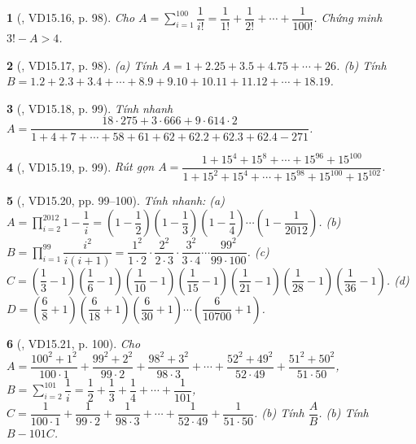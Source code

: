 \documentclass{article}
\newtheorem{baitoan}{}
\begin{document}
\begin{baitoan}[\cite{TLCT_THCS_Toan_6_so_hoc}, VD15.16, p. 98]
	Cho $A = \sum_{i=1}^{100} \dfrac{1}{i!} = \dfrac{1}{1!} + \dfrac{1}{2!} + \cdots + \dfrac{1}{100!}$. Chứng minh $3! - A > 4$.
\end{baitoan}

\begin{baitoan}[\cite{TLCT_THCS_Toan_6_so_hoc}, VD15.17, p. 98]
	(a) Tính $A = 1 + 2.25 + 3.5 + 4.75 + \cdots + 26$. (b) Tính $B = 1.2 + 2.3 + 3.4 + \cdots + 8.9 + 9.10 + 10.11 + 11.12 + \cdots + 18.19$.
\end{baitoan}

\begin{baitoan}[\cite{TLCT_THCS_Toan_6_so_hoc}, VD15.18, p. 99]
	Tính nhanh $A = \dfrac{18\cdot275 + 3\cdot666 + 9\cdot614\cdot2}{1 + 4 + 7 + \cdots + 58 + 61 + 62 + 62.2 + 62.3 + 62.4 - 271}$.
\end{baitoan}

\begin{baitoan}[\cite{TLCT_THCS_Toan_6_so_hoc}, VD15.19, p. 99]
	Rút gọn $A = \dfrac{1 + 15^4 + 15^8 + \cdots + 15^{96} + 15^{100}}{1 + 15^2 + 15^4 + \cdots + 15^{98} + 15^{100} + 15^{102}}$.
\end{baitoan}

\begin{baitoan}[\cite{TLCT_THCS_Toan_6_so_hoc}, VD15.20, pp. 99--100]
	Tính nhanh: (a) $A = \prod_{i=2}^{2012} 1  - \dfrac{1}{i} = \left(1 - \dfrac{1}{2}\right)\left(1 - \dfrac{1}{3}\right)\left(1 - \dfrac{1}{4}\right)\cdots\left(1 - \dfrac{1}{2012}\right)$. (b) $B = \prod_{i=1}^{99} \dfrac{i^2}{i(i + 1)} = \dfrac{1^2}{1\cdot2}\cdot\dfrac{2^2}{2\cdot3}\cdot\dfrac{3^2}{3\cdot4}\cdots\dfrac{99^2}{99\cdot100}$. (c) $C = \left(\dfrac{1}{3} - 1\right)\left(\dfrac{1}{6} - 1\right)\left(\dfrac{1}{10} - 1\right)\left(\dfrac{1}{15} - 1\right)\left(\dfrac{1}{21} - 1\right)\left(\dfrac{1}{28} - 1\right)\left(\dfrac{1}{36} - 1\right)$. (d) $D = \left(\dfrac{6}{8} + 1\right)\left(\dfrac{6}{18} + 1\right)\left(\dfrac{6}{30} + 1\right)\cdots\left(\dfrac{6}{10700} + 1\right)$.
\end{baitoan}

\begin{baitoan}[\cite{TLCT_THCS_Toan_6_so_hoc}, VD15.21, p. 100]
	Cho $A = \dfrac{100^2 + 1^2}{100\cdot1} + \dfrac{99^2 + 2^2}{99\cdot2} + \dfrac{98^2 + 3^2}{98\cdot3} + \cdots + \dfrac{52^2 + 49^2}{52\cdot49} + \dfrac{51^2 + 50^2}{51\cdot50}$, $B = \sum_{i=2}^{101} \dfrac{1}{i} = \dfrac{1}{2} + \dfrac{1}{3} + \dfrac{1}{4} + \cdots + \dfrac{1}{101}$, $C = \dfrac{1}{100\cdot1} + \dfrac{1}{99\cdot2} + \dfrac{1}{98\cdot3} + \cdots + \dfrac{1}{52\cdot49} + \dfrac{1}{51\cdot50}$. (b) Tính $\dfrac{A}{B}$. (b) Tính $B - 101C$.
\end{baitoan}
\end{document}
